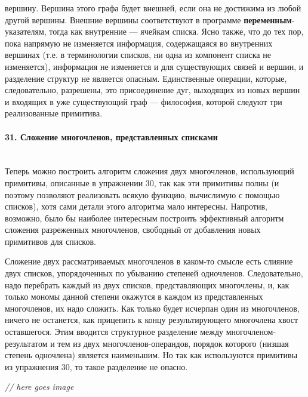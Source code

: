 \documentclass{../../template/mai_book}
\begin{document}
\newpage


\noindent
вершину. Вершина этого графа будет внешней, если она не достижима из любой другой вершины. Внешние вершины соответствуют в программе \textbf{переменным}-указателям, тогда как внутренние — ячейкам списка. Ясно также, что до тех пор, пока напрямую не изменяется информация, содержащаяся во внутренних вершинах (т.е. в терминологии списков, ни одна из компонент списка не изменяется), информация не изменяется и для существующих связей и вершин, и разделение структур не является опасным. Единственные операции, которые, следовательно, разрешены, это присоединение дуг, выходящих из новых вершин и входящих в уже существующий граф — философия, которой следуют три реализованные примитива.

\paragraph{31. Сложение многочленов, представленных списками} \mbox{}\\

Теперь можно построить алгоритм сложения двух многочленов, использующий примитивы, описанные в упражнении 30, так как эти примитивы полны (и поэтому позволяют реализовать всякую функцию, вычислимую с помощью списков), хотя сами детали этого алгоритма мало интересны. Напротив, возможно, было бы наиболее интересным построить эффективный алгоритм сложения разреженных  многочленов, свободный от добавления новых примитивов для списков.

Сложение двух рассматриваемых многочленов в каком-то смысле есть слияние двух списков, упорядоченных по убыванию степеней одночленов. Следовательно, надо перебрать каждый из двух списков, представляющих многочлены, и, как только мономы данной степени окажутся в каждом из представленных многочленов, их надо сложить. Как только будет исчерпан один из многочленов, ничего не останется, как прицепить к концу результирующего многочлена хвост  оставшегося. Этим вводится структурное разделение между многочленом-результатом и тем из двух многочленов-операндов, порядок которого (низшая степень одночлена) является наименьшим. Но так как используются примитивы из упражнения 30, то такое разделение не опасно. \newline

\textit{// here goes image}

\newpage
\end{document}
